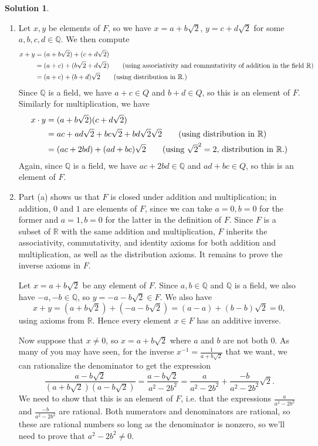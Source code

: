 \documentclass[12pt]{article}
\theoremstyle{definition}
\theoremstyle{definition}
\newtheorem*{soln}{Solution}
\newcommand{\Q}{\mathbb{Q}}
\newcommand{\R}{\mathbb{R}}
\begin{document}
\begin{soln}
\begin{enumerate}[label=(\alph*)]
\item Let $x,y$ be elements of $F$, so we have $x=a+b\sqrt{2}$, $y=c+d\sqrt{2}$ for some $a,b,c,d\in \Q$. We then compute
\begin{align*}
x+y &= (a+b\sqrt{2})+(c+d\sqrt{2}) \\
&= (a+c)+(b\sqrt{2}+d\sqrt{2}) \tag{using associativity and commutativity of addition in the field $\R$}\\
&= (a+c)+(b+d)\sqrt{2} \tag{using distribution in $\R$.}
\end{align*}
Since $\Q$ is a field, we have $a+c\in Q$ and $b+d\in Q$, so this is an element of $F$. Similarly for multiplication, we have
\begin{align*}
x\cdot y &= (a+b\sqrt{2})(c+d\sqrt{2}) \\
&= ac+ad\sqrt{2}+bc\sqrt{2}+bd\sqrt{2}\sqrt{2} \tag{using distribution in $\R$}\\
&= (ac+2bd)+(ad+bc)\sqrt{2} \tag{using $\sqrt{2}^2=2$, distribution in $\R$.}
\end{align*}
Again, since $\Q$ is a field, we have $ac+2bd\in\Q$ and $ad+bc\in Q$, so this is an element of $F$.

\item Part (a) shows us that $F$ is closed under addition and multiplication; in addition, $0$ and $1$ are elements of $F$, since we can take $a=0, b=0$ for the former and $a=1, b=0$ for the latter in the definition of $F$. Since $F$ is a subset of $\R$ with the same addition and multiplication, $F$ inherits the associativity, commutativity, and identity axioms for both addition and multiplication, as well as the distribution axioms. It remains to prove the inverse axioms in $F$.

Let $x=a+b\sqrt{2}$ be any element of $F$. Since $a,b\in\Q$ and $\Q$ is a field, we also have $-a,-b\in \Q$, so $y=-a-b\sqrt{2}\in F$. We also have
\[x+y=(a+b\sqrt{2})+(-a-b\sqrt{2})=(a-a)+(b-b)\sqrt{2}=0,\]
using axioms from $\R$. Hence every element $x\in F$ has an additive inverse.

Now suppose that $x\neq 0$, so $x=a+b\sqrt{2}$ where $a$ and $b$ are not both $0$. As many of you may have seen, for the inverse $x^{-1}=\frac{1}{a+b\sqrt{2}}$ that we want, we can rationalize the denominator to get the expression
\[\frac{a-b\sqrt{2}}{(a+b\sqrt{2})(a-b\sqrt{2})} = \frac{a-b\sqrt{2}}{a^2-2b^2}=\frac{a}{a^2-2b^2}+\frac{-b}{a^2-2b^2}\sqrt{2}.\]
We need to show that this is an element of $F$, i.e. that the expressions $\frac{a}{a^2-2b^2}$ and $\frac{-b}{a^2-2b^2}$ are rational. Both numerators and denominators are rational, so these are rational numbers so long as the denominator is nonzero, so we'll need to prove that $a^2-2b^2\neq 0$.


\end{enumerate}
\end{soln}
\end{document}

